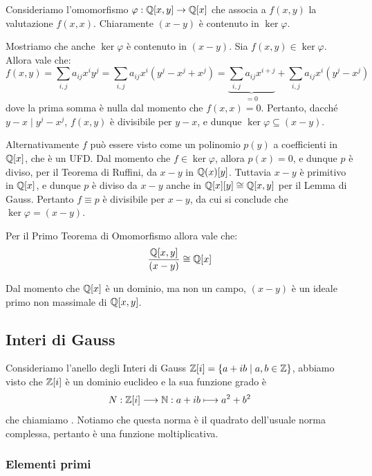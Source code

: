 \documentclass[11pt]{scrartcl}
\begin{document}
	\begin{remark}
		Consideriamo l'omomorfismo $\varphi : \mathbb Q[x, y] \to \mathbb Q[x]$ che
		associa a $f(x, y)$ la valutazione $f(x, x)$. Chiaramente
		$(x - y)$ è contenuto in $\ker \varphi$. \medskip


		Mostriamo che anche
		$\ker \varphi$ è contenuto in $(x - y)$. Sia $f(x, y) \in \ker \varphi$.
		Allora vale che:
		\[ f(x, y) = \sum_{i,j} a_{ij} x^i y^j = \sum_{i,j} a_{ij} x^i (y^j - x^j + x^j) = \underbrace{\sum_{i,j} a_{ij} x^{i+j}}_{=0} + \sum_{i,j} a_{ij} x^i (y^j - x^j) \]
		dove la prima somma è nulla dal momento che $f(x, x) = 0$. Pertanto,
		dacché $y-x \mid y^j - x^j$, $f(x, y)$ è divisibile per $y-x$, e dunque
		$\ker \varphi \subseteq (x-y)$. \medskip


		Alternativamente $f$ può essere visto come un polinomio $p(y)$ a coefficienti in
		$\mathbb Q[x]$, che è un UFD. Dal momento che $f \in \ker \varphi$, allora $p(x) = 0$, e
		dunque $p$ è diviso, per il Teorema di Ruffini, da $x - y$ in
		$\mathbb Q(x)[y]$. Tuttavia $x - y$ è primitivo in $\mathbb Q[x]$, e dunque
		$p$ è diviso da $x - y$ anche in $\mathbb Q[x][y] \cong \mathbb Q[x, y]$ per il
		Lemma di Gauss. Pertanto $f \equiv p$ è divisibile per $x - y$,
		da cui si conclude che $\ker \varphi = (x - y)$. \medskip
		
		
		Per il Primo Teorema di Omomorfismo allora vale che:
		\[ \frac{\mathbb Q[x, y]}{(x - y)} \cong \mathbb Q[x] \]
		
		
		Dal momento che $\mathbb Q[x]$ è un dominio, ma non un campo,
		$(x-y)$ è un ideale primo non massimale di $\mathbb Q[x, y]$.
	\end{remark}
	
	\newpage
	
	\subsection{Interi di Gauss}
	
	Consideriamo l'anello degli Interi di Gauss $\mathbb Z[i] = \{a + ib\mid a, b \in \mathbb Z\}$,
	abbiamo visto che $\mathbb Z[i]$ è un dominio euclideo e la sua funzione grado è
	\[
	N: \mathbb Z[i]\longrightarrow \mathbb N: a + ib \longmapsto a^2 + b^2
	\]
	che chiamiamo . Notiamo che questa norma è il quadrato dell'usuale 
	norma complessa, pertanto è una funzione moltiplicativa. 
	
	\subsubsection{Elementi primi}
	
\end{document}
